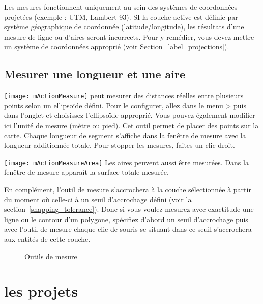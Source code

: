 Les mesures fonctionnent uniquement au sein des systèmes de coordonnées projetées (exemple : UTM, Lambert 93). SI la couche active est définie par système géographique de coordonnée (latitude/longitude), les résultats d'une mesure de ligne ou d'aires seront incorrects. Pour y remédier, vous devez mettre un système de coordonnées approprié (voir Section~\ref{label_projections}).

\subsection{Mesurer une longueur et une aire}
\texttt{[image: mActionMeasure]} 
\qg peut mesurer des distances réelles entre plusieurs points selon un ellipsoïde défini. Pour le configurer, allez dans le menu  > puis dans l'onglet  et choisissez l'ellipsoïde approprié. Vous pouvez également modifier ici l'unité de mesure (mètre ou pied). Cet outil permet de placer des points sur la carte. Chaque longueur de segment s'affiche dans la fenêtre de mesure avec la longueur additionnée totale. Pour stopper les mesures, faites un clic droit. \par
\texttt{[image: mActionMeasureArea]} Les aires peuvent aussi être mesurées.
Dans la fenêtre de mesure apparaît la surface totale mesurée. \par
En complément, l'outil de mesure s'accrochera à la couche sélectionnée à partir du moment où celle-ci à un seuil d'accrochage défini (voir la section~\ref{snapping_tolerance}). Donc si vous voulez mesurez avec exactitude une ligne ou le contour d'un polygone, spécifiez d'abord un seuil d'accrochage puis avec l'outil de mesure chaque clic de souris se situant dans ce seuil s'accrochera aux entités de cette couche.

\begin{figure}[ht]
\centering
  \hspace{1cm}
  \caption{Outils de mesure \nixcaption} \label{fig:measure}
\end{figure}

\section{les projets}\label{sec:projects}

